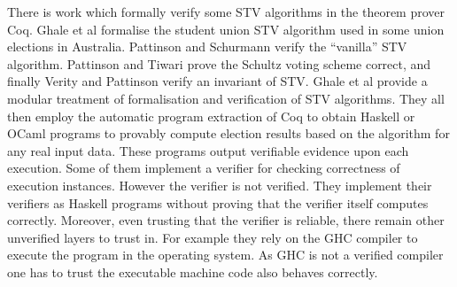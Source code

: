 \documentclass[10pt,conference]{IEEEtran}
\begin{document}
There is work which formally verify some STV algorithms in the theorem prover Coq. Ghale et al \cite{Ghale:2017:FVS} formalise the student union STV algorithm used in some union elections in Australia. Pattinson and Schurmann \cite{DBLP:conf/ausai/PattinsonS15}  verify the ``vanilla'' STV algorithm.   Pattinson and Tiwari \cite{DBLP:conf/itp/PattinsonT17} prove the Schultz voting scheme correct, and finally Verity and Pattinson verify \cite{DBLP:conf/acsw/VerityP17} an invariant of STV. Ghale et al \cite{Ghale2018} provide a modular treatment of formalisation and verification of STV algorithms. 
They all then employ the automatic program extraction of Coq to obtain Haskell or OCaml programs to provably compute election results based on the algorithm for any real input data. These programs output verifiable evidence upon each execution. Some of them \cite{DBLP:conf/ausai/PattinsonS15,
DBLP:conf/itp/PattinsonT17} implement a verifier for checking correctness of execution instances. However the verifier is not verified. They implement their verifiers as  Haskell programs without proving that the verifier itself computes correctly. Moreover, even trusting that the verifier is reliable, there remain other unverified layers to trust in. For example  they rely on the GHC compiler to execute the program in the operating system. As GHC is not a verified compiler one has to trust the executable machine code also behaves correctly. 
\end{document}
